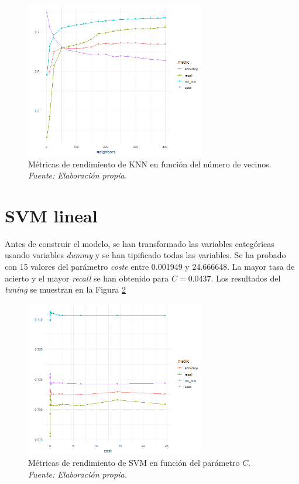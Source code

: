 \documentclass[12pt,a4paper,]{book}
\newcounter{dummy}
\numberwithin{dummy}{section}
\theoremstyle{ocrenumbox}
\theoremstyle{blacknumex}
\theoremstyle{blacknumbox}
\theoremstyle{ocrenum}
\theoremstyle{ocrenum}
\begin{document}
\begin{figure}[h!]
\centering
\includegraphics[width =0.7\textwidth]{graficos/knn_tuningplot.png}
\caption[Métricas de rendimiento de KNN en función de $k$]{Métricas de rendimiento de KNN en función del número de vecinos. \it Fuente: Elaboración propia.}
\label{fig:knn_tuningplot}
\end{figure}

\hypertarget{svm-lineal}{%
\section{SVM lineal}\label{svm-lineal}}

Antes de construir el modelo, se han transformado las variables
categóricas usando variables \emph{dummy} y se han tipificado todas las
variables. Se ha probado con 15 valores del parámetro \emph{coste} entre
0.001949 y 24.666648. La mayor tasa de acierto y el mayor \emph{recall}
se han obtenido para \(C = 0.0437\). Los resultados del \emph{tuning} se
muestran en la Figura \ref{fig:svm_tuningplot}

\begin{figure}[h!]
\centering
\includegraphics[width =0.7\textwidth]{graficos/svm_tuningplot.png}
\caption[Métricas de rendimiento de SVM en función del parámetro $coste$]{Métricas de rendimiento de SVM en función del parámetro $C$. \it Fuente: Elaboración propia.}
\label{fig:svm_tuningplot}
\end{figure}
\end{document}
